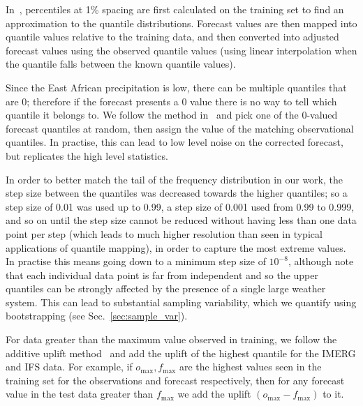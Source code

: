 \documentclass{article}
\begin{document}
In~\cite{boe_statistical_2007}, percentiles at 1\% spacing are first calculated on the training set to find an approximation to the quantile distributions. Forecast values are then mapped into quantile values relative to the training data, and then converted into adjusted forecast values using the observed quantile values (using linear interpolation when the quantile falls between the known quantile values). 

Since the East African precipitation is low, there can be multiple quantiles that are 0; therefore if the forecast presents a 0 value there is no way to tell which quantile it belongs to. We follow the method in~\cite{boe_statistical_2007} and pick one of the 0-valued forecast quantiles at random, then assign the value of the matching observational quantiles. In practise, this can lead to low level noise on the corrected forecast, but replicates the high level statistics.

In order to better match the tail of the frequency distribution in our work, the step size between the quantiles was decreased towards the higher quantiles; so a step size of 0.01 was used up to 0.99, a step size of 0.001 used from 0.99 to 0.999, and so on until the step size cannot be reduced without having less than one data point per step (which leads to much higher resolution than seen in typical applications of quantile mapping), in order to capture the most extreme values. In practise this means going down to a minimum step size of $10^{-8}$, although note that each individual data point is far from independent and so the upper quantiles can be strongly affected by the presence of a single large weather system. This can lead to substantial sampling variability, which we quantify using bootstrapping (see Sec.~\ref{sec:sample_var}).



For data greater than the maximum value observed in training, we follow the additive uplift method~\citep{boe_statistical_2007, deque_frequency_2007} and add the uplift of the highest quantile for the IMERG and IFS data. For example, if $o_{\text{max}},f_{\text{max}}$ are the highest values seen in the training set for the observations and forecast respectively, then for any forecast value in the test data greater than $f_{\text{max}}$ we add the uplift $(o_{\text{max}} - f_{\text{max}})$ to it. 
\end{document}
